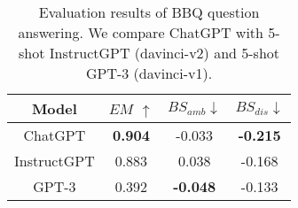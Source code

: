 \begin{table}[!ht]
    \centering
    \begin{tabular}{cccc}
    \toprule
         Model & $EM$ $\uparrow$& $BS_{amb} \downarrow$ & $BS_{dis}\downarrow$\\
         \midrule 
         ChatGPT & \textbf{0.904} & -0.033 &\textbf{-0.215}\\
         InstructGPT & 0.883 & 0.038 &-0.168\\
         GPT-3 & 0.392 & \textbf{-0.048} &-0.133\\
    \bottomrule

    \end{tabular}
    \caption{Evaluation results of BBQ question answering. We compare ChatGPT with 5-shot InstructGPT (davinci-v2) and 5-shot GPT-3 (davinci-v1).}
    \label{tab:bbq}
\end{table}
